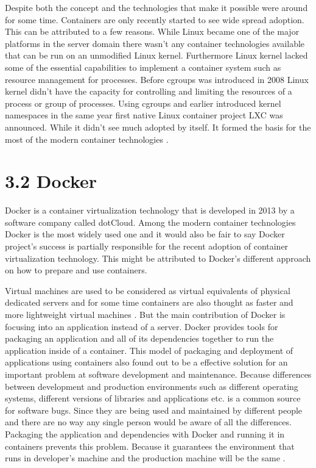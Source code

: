 \documentclass[12pt,oneandhalf,chaparabic,ceng,ms,eng,oneside,pntc]{gsufbe}
\begin{document}
Despite both the concept and the technologies that make it possible were around for some time.
Containers are only recently started to see wide spread adoption.  This can be attributed to a few
reasons.  While Linux became one of the major platforms in the server domain there wasn't any container
technologies available that can be run on an unmodified Linux kernel.  Furthermore Linux kernel lacked
some of the essential capabilities to implement a container system such as resource management for
processes.  Before cgroups was introduced in 2008 Linux kernel didn't have the capacity for controlling
and limiting the resources of a process or group of processes.  Using cgroups and earlier introduced
kernel namespaces in the same year first native Linux
container project LXC \cite{lxc} was announced.  While it didn't see much adopted by itself.  It formed
the basis
for the most of the modern container technologies \cite{singh_containers_2016}.

\section[Docker]{3.2 Docker}
Docker is a container virtualization technology \cite{docker} that is developed in 2013 by a software
company called
dotCloud.  Among the modern container technologies Docker is the most widely used one and it would also
be fair to say Docker project's success is partially responsible for the recent adoption of container
virtualization technology.  This might be attributed to Docker's different approach on how to prepare 
and use containers.

Virtual machines are used to be considered as virtual equivalents of physical dedicated servers and for
some time containers are also thought as faster and more lightweight virtual machines
\cite{adufu_is_2015}.  But the main
contribution of Docker is focusing into an application instead of a server.  Docker provides tools for
packaging an application and all of its dependencies together to run the application inside of a
container.  This model of packaging and deployment of applications using containers also found out to be
a effective solution for an important problem at software development and maintenance.  Because 
differences between development and production environments such as different operating systems, 
different versions of libraries and applications etc. is a common source for software bugs.  Since they
are being used and  maintained by different people and there are no way any single person would be
aware of all the differences.  Packaging the application and dependencies with Docker and running it in
containers prevents this problem.  Because it guarantees the environment that runs in developer’s
machine and the production machine will be the same \cite{boettiger_introduction_2015}.
\end{document}
